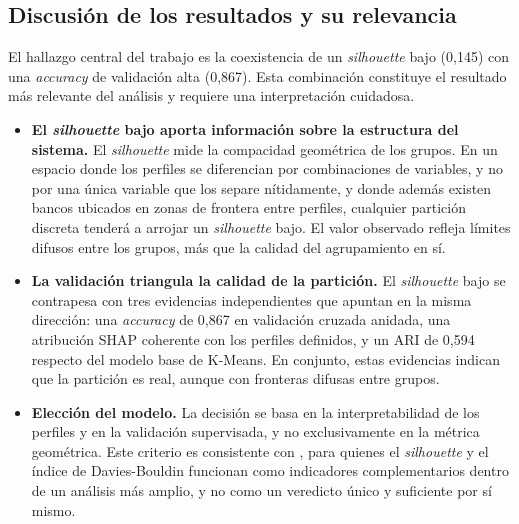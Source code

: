 \documentclass[11pt,a4paper]{article}
\begin{document}
\subsection{Discusión de los resultados y su relevancia}
\label{sec:discusion}
El hallazgo central del trabajo es la coexistencia de un \textit{silhouette} bajo (0,145) con una
\textit{accuracy} de validación alta (0,867). Esta combinación constituye el resultado más relevante del
análisis y requiere una interpretación cuidadosa.
\begin{itemize}
  \item \textbf{El \textit{silhouette} bajo aporta información sobre la estructura del sistema.} El
  \textit{silhouette} mide la compacidad geométrica de los grupos. En un espacio donde los perfiles se
  diferencian por combinaciones de variables, y no por una única variable que los separe nítidamente, y
  donde además existen bancos ubicados en zonas de frontera entre perfiles, cualquier partición discreta
  tenderá a arrojar un \textit{silhouette} bajo. El valor observado refleja límites difusos entre los
  grupos, más que la calidad del agrupamiento en sí.
  \item \textbf{La validación triangula la calidad de la partición.} El \textit{silhouette} bajo se
  contrapesa con tres evidencias independientes que apuntan en la misma dirección: una \textit{accuracy}
  de 0,867 en validación cruzada anidada, una atribución SHAP coherente con los perfiles definidos, y un
  ARI de 0,594 respecto del modelo base de K-Means. En conjunto, estas evidencias indican que la
  partición es real, aunque con fronteras difusas entre grupos.
  \item \textbf{Elección del modelo.} La decisión se basa en la interpretabilidad de los perfiles y en la
  validación supervisada, y no exclusivamente en la métrica geométrica. Este criterio es consistente con
  \citet{mercadier2025}, para quienes el \textit{silhouette} y el índice de Davies-Bouldin funcionan como
  indicadores complementarios dentro de un análisis más amplio, y no como un veredicto único y suficiente
  por sí mismo.
\end{itemize}
\end{document}
